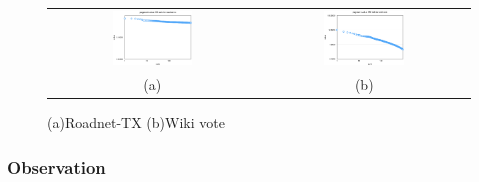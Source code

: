 \begin{figure}[h]
\begin{center}
\begin{tabular}{cc}
     \includegraphics[width=0.4\textwidth]{FIG/t2_tx.png} &
     \includegraphics[width=0.4\textwidth]{FIG/t2_wikivote.png} \\
    (a) & (b) 
\end{tabular}
\caption{(a)Roadnet-TX (b)Wiki vote}
\label{t2:5}
\end{center}
\end{figure}


\subsubsection{Observation}

